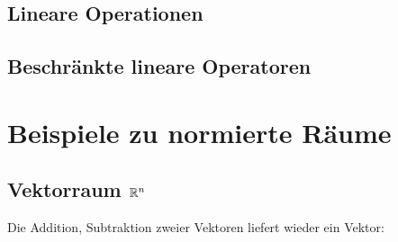 \documentclass[letterpaper,10pt,english]{jupyterBook}
\begin{document}
\section{Lineare Operationen}
\label{\detokenize{Funktionalanalysis/Funktionalanalysis:lineare-operationen}}

\section{Beschränkte lineare Operatoren}
\label{\detokenize{Funktionalanalysis/Funktionalanalysis:beschrankte-lineare-operatoren}}

\chapter{Beispiele zu normierte Räume}
\label{\detokenize{Funktionalanalysis/Beispiele:beispiele-zu-normierte-raume}}\label{\detokenize{Funktionalanalysis/Beispiele::doc}}

\section{Vektorraum \protect\(\mathbb{R}^n\protect\)}
\label{\detokenize{Funktionalanalysis/Beispiele:vektorraum-mathbb-r-n}}
\begin{sphinxVerbatim}[commandchars=\\\{\}]
   
\end{sphinxVerbatim}

\begin{sphinxVerbatim}[commandchars=\\\{\}]
  \PYG{p}{[}\PYG{p}{]}
  \PYG{p}{[}    \PYG{p}{]}
\end{sphinxVerbatim}

Die Addition, Subtraktion zweier Vektoren liefert wieder ein Vektor:

\begin{sphinxVerbatim}[commandchars=\\\{\}]
\end{sphinxVerbatim}
\end{document}
